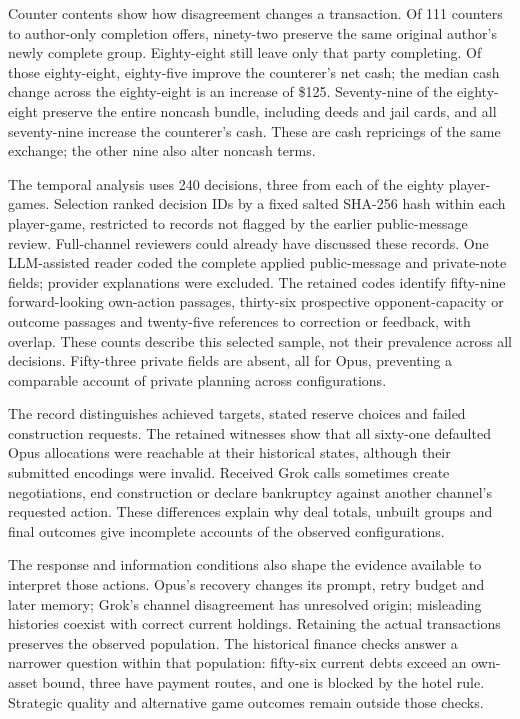 
Counter contents show how disagreement changes a transaction. Of 111 counters to author-only completion offers, ninety-two preserve the same original author's newly complete group. Eighty-eight still leave only that party completing. Of those eighty-eight, eighty-five improve the counterer's net cash; the median cash change across the eighty-eight is an increase of \$125. Seventy-nine of the eighty-eight preserve the entire noncash bundle, including deeds and jail cards, and all seventy-nine increase the counterer's cash. These are cash repricings of the same exchange; the other nine also alter noncash terms.

The temporal analysis uses 240 decisions, three from each of the eighty player-games. Selection ranked decision IDs by a fixed salted SHA-256 hash within each player-game, restricted to records not flagged by the earlier public-message review. Full-channel reviewers could already have discussed these records. One LLM-assisted reader coded the complete applied public-message and private-note fields; provider explanations were excluded. The retained codes identify fifty-nine forward-looking own-action passages, thirty-six prospective opponent-capacity or outcome passages and twenty-five references to correction or feedback, with overlap. These counts describe this selected sample, not their prevalence across all decisions. Fifty-three private fields are absent, all for Opus, preventing a comparable account of private planning across configurations.

The record distinguishes achieved targets, stated reserve choices and failed construction requests. The retained witnesses show that all sixty-one defaulted Opus allocations were reachable at their historical states, although their submitted encodings were invalid. Received Grok calls sometimes create negotiations, end construction or declare bankruptcy against another channel's requested action. These differences explain why deal totals, unbuilt groups and final outcomes give incomplete accounts of the observed configurations.

The response and information conditions also shape the evidence available to interpret those actions. Opus's recovery changes its prompt, retry budget and later memory; Grok's channel disagreement has unresolved origin; misleading histories coexist with correct current holdings. Retaining the actual transactions preserves the observed population. The historical finance checks answer a narrower question within that population: fifty-six current debts exceed an own-asset bound, three have payment routes, and one is blocked by the hotel rule. Strategic quality and alternative game outcomes remain outside those checks.

